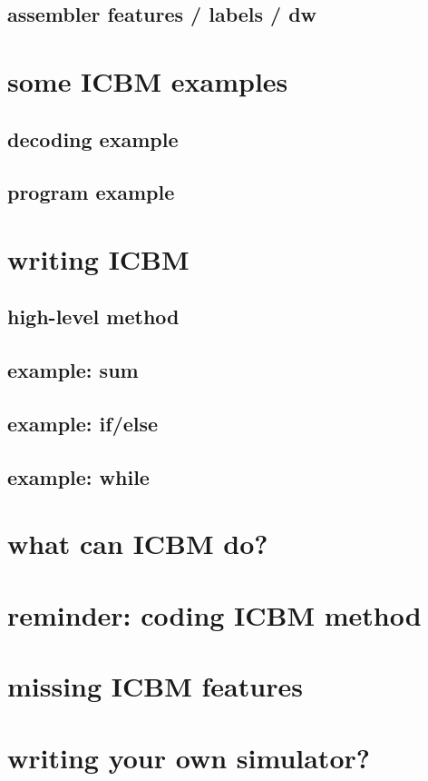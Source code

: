

\subsection{assembler features / labels / dw}



\section{some ICBM examples}

\subsection{decoding example}


\subsection{program example}


\section{writing ICBM}

\subsection{high-level method}



\subsection{example: sum}



\subsection{example: if/else}

\subsection{example: while}

\section{what can ICBM do?}


\section{reminder: coding ICBM method}



\section{missing ICBM features}

\section{writing your own simulator?}

